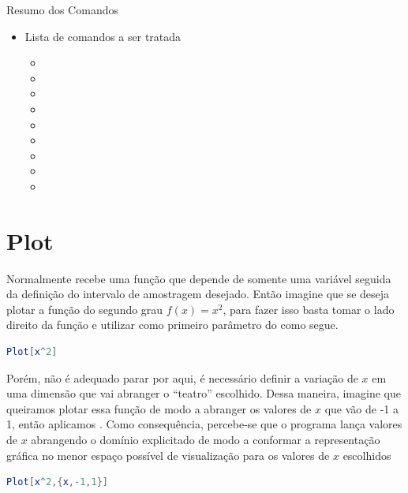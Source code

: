 \documentclass[a4paper, 12pt]{article}
\begin{document}
	\begin{center}
		\begin{huge}
			Resumo dos Comandos
		\end{huge}
	\end{center}

	\begin{itemize}
		\item Lista de comandos a ser tratada
		\begin{itemize}
			\item{}
			\item{}
			\item{}
			\item{}
			\item{}
			\item{}
			\item{}
			\item{}
			\item{}
		\end{itemize}
	\end{itemize}

	\section{Plot}
	Normalmente recebe uma função que depende de somente uma variável seguida da definição do intervalo de amostragem desejado. Então imagine que se deseja plotar a função do segundo grau $f(x)=x^{2}$, para fazer isso basta tomar o lado direito da função e utilizar como primeiro parâmetro do  como segue.	

\begin{lstlisting}[language=Mathematica]
Plot[x^2]
\end{lstlisting}
	
	Porém, não é adequado parar por aqui, é necessário definir a variação de $x$ em uma dimensão que vai abranger o ``teatro'' escolhido. Dessa maneira, imagine que queiramos plotar essa função de modo a abranger os valores de $x$ que vão de -1 a 1, então aplicamos . Como consequência, percebe-se que o programa lança valores de $x$ abrangendo o domínio explicitado de modo a conformar a representação gráfica no menor espaço possível de visualização para os valores de $x$ escolhidos
	
\begin{lstlisting}[language=Mathematica]
Plot[x^2,{x,-1,1}]
\end{lstlisting}
\end{document}
